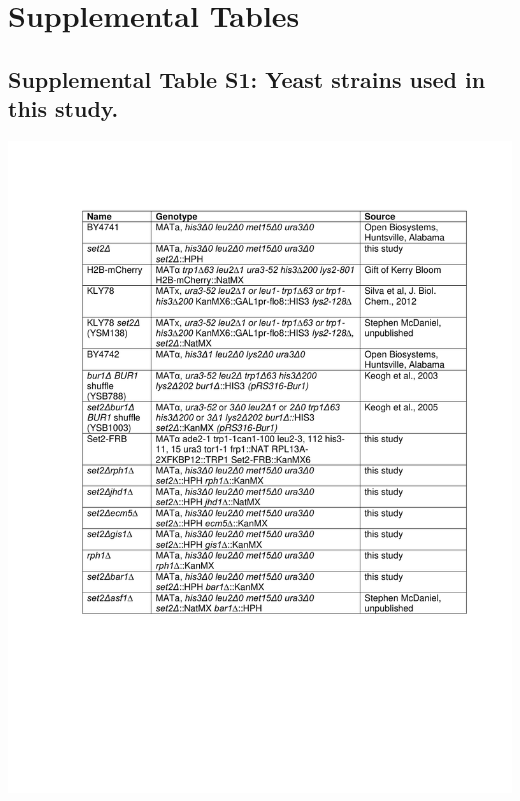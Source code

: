 \documentclass[11pt]{biorxiv}
\begin{document}
\clearpage

\section{Supplemental Tables}
\renewcommand{\thetable}{S\arabic{table}}

\subsection{Supplemental Table S1: Yeast strains used in this study.}
\begin{table}[ht!]
\center
\includegraphics[width=\textwidth, trim={0in 2.5in 0in 1in}, clip]{tables/Supplemental_Table1.pdf}
\end{table}
\end{document}
